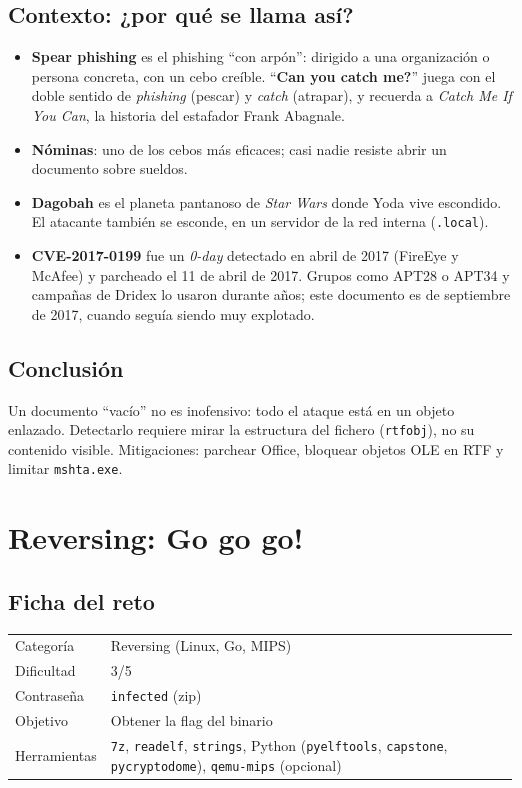 \documentclass[11pt,a4paper]{article}
\begin{document}
\subsection{Contexto: ¿por qué se llama así?}
\begin{itemize}
  \item \textbf{Spear phishing} es el phishing ``con arpón'': dirigido a una organización o persona concreta, con un
        cebo creíble. ``\textbf{Can you catch me?}'' juega con el doble sentido de \emph{phishing} (pescar) y
        \emph{catch} (atrapar), y recuerda a \emph{Catch Me If You Can}, la historia del estafador Frank Abagnale.
  \item \textbf{Nóminas}: uno de los cebos más eficaces; casi nadie resiste abrir un documento sobre sueldos.
  \item \textbf{Dagobah} es el planeta pantanoso de \emph{Star Wars} donde Yoda vive escondido. El atacante también se
        esconde, en un servidor de la red interna (\texttt{.local}).
  \item \textbf{CVE-2017-0199} fue un \emph{0-day} detectado en abril de 2017 (FireEye y McAfee) y parcheado el 11 de
        abril de 2017. Grupos como APT28 o APT34 y campañas de Dridex lo usaron durante años; este documento es de
        septiembre de 2017, cuando seguía siendo muy explotado.
\end{itemize}

\subsection{Conclusión}
Un documento ``vacío'' no es inofensivo: todo el ataque está en un objeto enlazado. Detectarlo requiere mirar la
estructura del fichero (\texttt{rtfobj}), no su contenido visible. Mitigaciones: parchear Office, bloquear objetos OLE
en RTF y limitar \texttt{mshta.exe}.


\clearpage
\section{Reversing: Go go go!}

\subsection{Ficha del reto}
\begin{tabularx}{\linewidth}{@{}lX@{}}
\toprule
Categoría & Reversing (Linux, Go, MIPS) \\
Dificultad & 3/5 \\
Contraseña & \texttt{infected} (zip) \\
Objetivo & Obtener la flag del binario \\
Herramientas & \texttt{7z}, \texttt{readelf}, \texttt{strings}, Python (\texttt{pyelftools}, \texttt{capstone},
  \texttt{pycryptodome}), \texttt{qemu-mips} (opcional) \\
\bottomrule
\end{tabularx}
\end{document}
